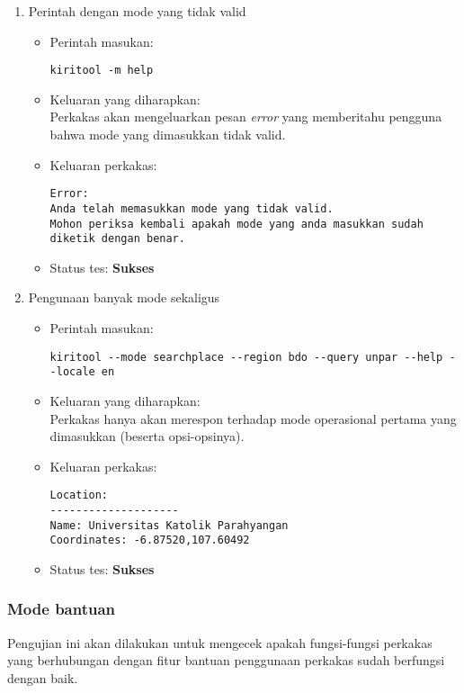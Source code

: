 \begin{enumerate}
	\item Perintah dengan mode yang tidak valid
	\begin{itemize}
		\item Perintah masukan:
		\begin{lstlisting}
kiritool -m help
		\end{lstlisting}
		\item Keluaran yang diharapkan: \\
		Perkakas akan mengeluarkan pesan \textit{error} yang memberitahu pengguna bahwa mode yang dimasukkan tidak valid.
		\item Keluaran perkakas:
		\begin{lstlisting}
Error:
Anda telah memasukkan mode yang tidak valid.
Mohon periksa kembali apakah mode yang anda masukkan sudah diketik dengan benar.
		\end{lstlisting}
		\item Status tes: \textbf{Sukses}
	\end{itemize}
	
	\item Pengunaan banyak mode sekaligus
	\begin{itemize}
		\item Perintah masukan:
		\begin{lstlisting}
kiritool --mode searchplace --region bdo --query unpar --help --locale en
		\end{lstlisting}
		\item Keluaran yang diharapkan: \\
		Perkakas hanya akan merespon terhadap mode operasional pertama yang dimasukkan (beserta opsi-opsinya).
		\item Keluaran perkakas:
		\begin{lstlisting}
Location:
--------------------
Name: Universitas Katolik Parahyangan
Coordinates: -6.87520,107.60492
		\end{lstlisting}
		\item Status tes: \textbf{Sukses}
	\end{itemize}

\end{enumerate}

\subsubsection{Mode bantuan}
\label{sec:testing-experiments-testing-help}

Pengujian ini akan dilakukan untuk mengecek apakah fungsi-fungsi perkakas yang berhubungan dengan fitur bantuan penggunaan perkakas sudah berfungsi dengan baik.

